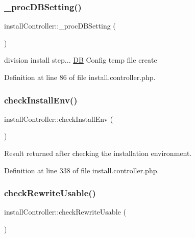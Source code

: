 \subsubsection{\texorpdfstring{\+\_\+proc\+D\+B\+Setting()}{\_procDBSetting()}}
{\footnotesize\ttfamily install\+Controller\+::\+\_\+proc\+D\+B\+Setting (\begin{DoxyParamCaption}{ }\end{DoxyParamCaption})}



division install step... \hyperlink{classDB}{DB} Config temp file create 



Definition at line 86 of file install.\+controller.\+php.

\hypertarget{classinstallController_a6cd48bffa15badc616c0b860c59d410e}{}\label{classinstallController_a6cd48bffa15badc616c0b860c59d410e} 
\subsubsection{\texorpdfstring{check\+Install\+Env()}{checkInstallEnv()}}
{\footnotesize\ttfamily install\+Controller\+::check\+Install\+Env (\begin{DoxyParamCaption}{ }\end{DoxyParamCaption})}



Result returned after checking the installation environment. 



Definition at line 338 of file install.\+controller.\+php.

\hypertarget{classinstallController_ae621886c36c43926d81f6beb56cfde25}{}\label{classinstallController_ae621886c36c43926d81f6beb56cfde25} 
\subsubsection{\texorpdfstring{check\+Rewrite\+Usable()}{checkRewriteUsable()}}
{\footnotesize\ttfamily install\+Controller\+::check\+Rewrite\+Usable (\begin{DoxyParamCaption}{ }\end{DoxyParamCaption})}


